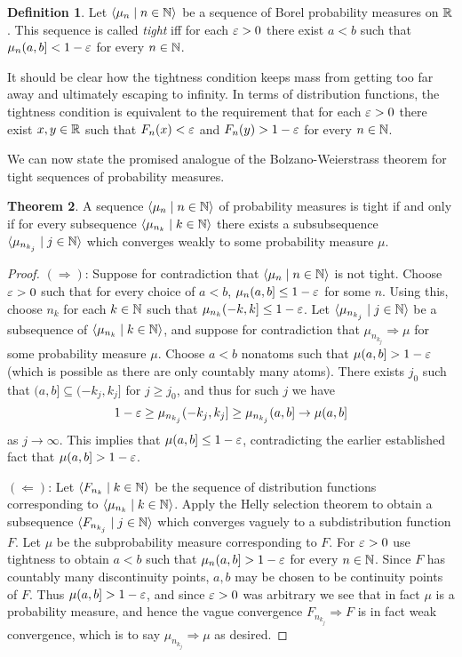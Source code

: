 \documentclass{article}
\theoremstyle{definition}
\newtheorem{theorem}{Theorem}[section]
\newtheorem{definition}[theorem]{Definition}
\newcommand{\bldseq}[2]{\langle{#1}\mid{#2}\rangle}
\begin{document}
\begin{definition}
Let $\bldseq{\mu_n}{n \in \N}$ be a sequence of Borel probability measures on $\mathbb{R}$. This sequence is called {\em tight} iff for each $\varepsilon > 0$ there exist $a < b$ such that $\mu_n (a,b] < 1 - \varepsilon$ for every $n \in \mathbb{N}$. 
\end{definition}

It should be clear how the tightness condition keeps mass from getting too far away and ultimately escaping to infinity. In terms of distribution functions, the tightness condition is equivalent to the requirement that for each $\varepsilon > 0$ there exist $x, y \in \mathbb{R}$ such that $F_n(x) < \varepsilon$ and $F_n(y) > 1 - \varepsilon$ for every $n \in \mathbb{N}$.

We can now state the promised analogue of the Bolzano-Weierstrass theorem for tight sequences of probability measures.

\begin{theorem}
A sequence $\bldseq{\mu_n}{n \in \N}$ of probability measures is tight if and only if for every subsequence $\bldseq{\mu_{n_k}}{k \in \N}$ there exists a subsubsequence $\bldseq{\mu_{n_{k_j}}}{j \in \N}$ which converges weakly to some probability measure $\mu$.
\end{theorem}

\begin{proof}
$(\Longrightarrow)$: Suppose for contradiction that $\bldseq{\mu_n}{n \in \N}$ is not tight. Choose $\varepsilon > 0$ such that for every choice of $a < b$, $\mu_n (a,b] \le 1 - \varepsilon$ for some $n$. Using this, choose $n_k$ for each $k \in \mathbb{N}$ such that $\mu_{n_k} (-k,k] \le 1 - \varepsilon$. Let $\bldseq{\mu_{n_{k_j}}}{j \in \N}$ be a subsequence of $\bldseq{\mu_{n_k}}{k \in \N}$, and suppose for contradiction that $\mu_{n_{k_j}} \Rightarrow \mu$ for some probability measure $\mu$. Choose $a < b$ nonatoms such that $\mu (a,b] > 1 - \varepsilon$ (which is possible as there are only countably many atoms). There exists $j_0$ such that $(a,b] \subseteq (-k_j, k_j]$ for $j \ge j_0$, and thus for such $j$ we have
\[ 1 - \varepsilon \ge \mu_{n_{k_j}} (-k_j, k_j] \ge \mu_{n_{k_j}} (a,b] \rightarrow \mu (a,b] \]
as $j \rightarrow \infty$. This implies that $\mu (a,b] \le 1 - \varepsilon$, contradicting the earlier established fact that $\mu (a,b] > 1 - \varepsilon$.

$(\Longleftarrow)$: Let $\bldseq{F_{n_k}}{k \in \N}$ be the sequence of distribution functions corresponding to $\bldseq{\mu_{n_k}}{k \in \N}$. Apply the Helly selection theorem to obtain a subsequence $\bldseq{F_{n_{k_j}}}{j \in \N}$ which converges vaguely to a subdistribution function $F$. Let $\mu$ be the subprobability measure corresponding to $F$. For $\varepsilon > 0$ use tightness to obtain $a < b$ such that $\mu_n (a,b] > 1 - \varepsilon$ for every $n \in \mathbb{N}$. Since $F$ has countably many discontinuity points, $a,b$ may be chosen to be continuity points of $F$. Thus $\mu (a,b] > 1 - \varepsilon$, and since $\varepsilon > 0$ was arbitrary we see that in fact $\mu$ is a probability measure, and hence the vague convergence $F_{n_{k_j}} \Rightarrow F$ is in fact weak convergence, which is to say $\mu_{n_{k_j}} \Rightarrow \mu$ as desired.
\end{proof}
\end{document}
